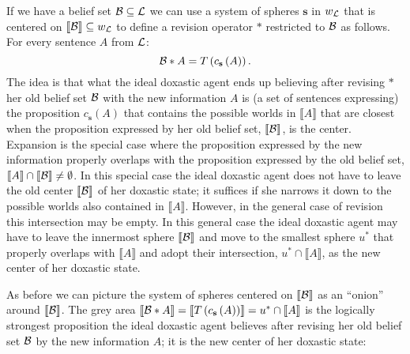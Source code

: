 If we have a belief set $\cal B\subseteq L$ we can use a system of spheres $\textbf{s}$ in $w_{\cal L}$ that is centered on $\llbracket\begin{cal}B\end{cal}\rrbracket\subseteq w_{\cal L}$ to define a revision operator $*$ restricted to $\cal B$ as follows. For every sentence $A$ from $\cal L$:
$$\begin{cal}B\end{cal}*A=T\left(c_{\textbf{s}}\left(A\right)\right).$$
The idea is that what the ideal doxastic agent ends up believing after revising $*$ her old belief set $\cal B$ with the new information $A$ is (a set of sentences expressing) the proposition $c_{\textbf{s}}\left(A\right)$ that contains the possible worlds in $\llbracket A\rrbracket$ that are closest when the proposition expressed by her old belief set, $\llbracket\cal B\rrbracket$, is the center. Expansion is the special case where the proposition expressed by the new information properly overlaps with the proposition expressed by the old belief set, $\llbracket A\rrbracket\cap\llbracket\cal B\rrbracket\neq\emptyset$. In this special case the ideal doxastic agent does not have to leave the old center $\llbracket\cal B\rrbracket$ of her doxastic state; it suffices if she narrows it down to the possible worlds also contained in $\llbracket A\rrbracket$. However, in the general case of revision this intersection may be empty. In this general case the ideal doxastic agent may have to leave the innermost sphere $\llbracket\cal B\rrbracket$ and move to the smallest sphere $u^*$ that properly overlaps with $\llbracket A\rrbracket$ and adopt their intersection, $u^*\cap\llbracket A\rrbracket$, as the new center of her doxastic state.

As before we can picture the system of spheres centered on $\llbracket\cal B\rrbracket$ as an ``onion'' around $\llbracket\cal B\rrbracket$. The grey area $\llbracket\begin{cal}B\end{cal}*A\rrbracket=\llbracket T\left(c_{\textbf{s}}\left(A\right)\right)\rrbracket=u^*\cap\llbracket A\rrbracket$ is the logically strongest proposition the ideal doxastic agent believes after revising her old belief set $\cal B$ by the new information $A$; it is the new center of her doxastic state:


